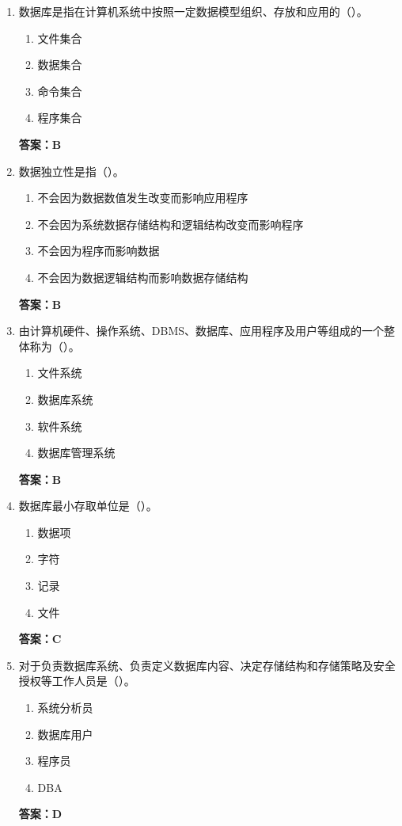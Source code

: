 \documentclass[12pt, a4paper]{article}
\begin{document}
\begin{enumerate}[label=\arabic*.]
	\item 数据库是指在计算机系统中按照一定数据模型组织、存放和应用的（\quad）。
	      \begin{enumerate}
		      \item 文件集合
		      \item 数据集合
		      \item 命令集合
		      \item 程序集合
	      \end{enumerate}
	      \textbf{答案：B}

	\item 数据独立性是指（\quad）。
	      \begin{enumerate}
		      \item 不会因为数据数值发生改变而影响应用程序
		      \item 不会因为系统数据存储结构和逻辑结构改变而影响程序
		      \item 不会因为程序而影响数据
		      \item 不会因为数据逻辑结构而影响数据存储结构
	      \end{enumerate}
	      \textbf{答案：B}

	\item 由计算机硬件、操作系统、DBMS、数据库、应用程序及用户等组成的一个整体称为（\quad）。
	      \begin{enumerate}
		      \item 文件系统
		      \item 数据库系统
		      \item 软件系统
		      \item 数据库管理系统
	      \end{enumerate}
	      \textbf{答案：B}

	\item 数据库最小存取单位是（\quad）。
	      \begin{enumerate}
		      \item 数据项
		      \item 字符
		      \item 记录
		      \item 文件
	      \end{enumerate}
	      \textbf{答案：C}

	\item 对于负责数据库系统、负责定义数据库内容、决定存储结构和存储策略及安全授权等工作人员是（\quad）。
	      \begin{enumerate}
		      \item 系统分析员
		      \item 数据库用户
		      \item 程序员
		      \item DBA
	      \end{enumerate}
	      \textbf{答案：D}


\end{enumerate}
\end{document}
